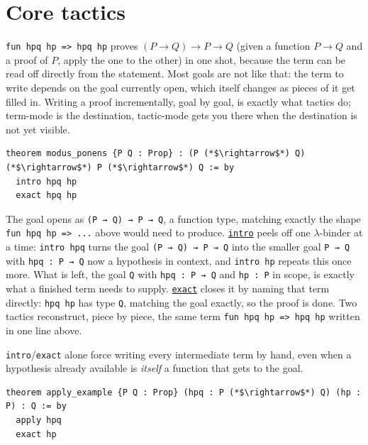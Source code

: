 \section{Core tactics}\label{sec:05-tactics:02-core-tactics:1}

\texttt{fun hpq hp => hpq hp} proves \((P \to Q) \to P \to Q\) (given a function \(P\to Q\) and a proof of \(P\), apply the one to the other) in one shot, because the term can be read off directly from the statement. Most goals are not like that: the term to write depends on the goal currently open, which itself changes as pieces of it get filled in. Writing a proof incrementally, goal by goal, is exactly what tactics do; term-mode is the destination, tactic-mode gets you there when the destination is not yet visible.

\begin{lstlisting}
theorem modus_ponens {P Q : Prop} : (P (*$\rightarrow$*) Q) (*$\rightarrow$*) P (*$\rightarrow$*) Q := by
  intro hpq hp
  exact hpq hp
\end{lstlisting}

The goal opens as \texttt{(P → Q) → P → Q}, a function type, matching exactly the shape \texttt{fun hpq hp => ...} above would need to produce. \href{https://lean-lang.org/doc/reference/latest/Tactic-Proofs/Tactic-Reference/}{\texttt{intro}} peels off one \(\lambda\)-binder at a time: \texttt{intro hpq} turns the goal \texttt{(P → Q) → P → Q} into the smaller goal \texttt{P → Q} with \texttt{hpq : P → Q} now a hypothesis in context, and \texttt{intro hp} repeats this once more. What is left, the goal \texttt{Q} with \texttt{hpq : P → Q} and \texttt{hp : P} in scope, is exactly what a finished term needs to supply. \href{https://lean-lang.org/doc/reference/latest/Tactic-Proofs/Tactic-Reference/}{\texttt{exact}} closes it by naming that term directly: \texttt{hpq hp} has type \texttt{Q}, matching the goal exactly, so the proof is done. Two tactics reconstruct, piece by piece, the same term \texttt{fun hpq hp => hpq hp} written in one line above.

\texttt{intro}/\texttt{exact} alone force writing every intermediate term by hand, even when a hypothesis already available is \emph{itself} a function that gets to the goal.

\begin{lstlisting}
theorem apply_example {P Q : Prop} (hpq : P (*$\rightarrow$*) Q) (hp : P) : Q := by
  apply hpq
  exact hp
\end{lstlisting}

